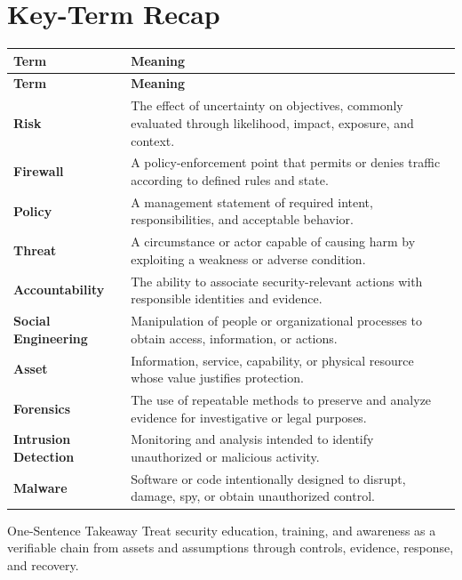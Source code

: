 \documentclass[11pt,letterpaper]{article}
\begin{document}
\section*{Key-Term Recap}
\begin{longtable}{>{\raggedright\arraybackslash}p{}>{\raggedright\arraybackslash}p{}}
\toprule\rowcolor{Navy}\color{white}\textbf{Term} & \color{white}\textbf{Meaning}\\\midrule
\endfirsthead
\toprule\rowcolor{Navy}\color{white}\textbf{Term} & \color{white}\textbf{Meaning}\\\midrule
\endhead
\textbf{Risk} & The effect of uncertainty on objectives, commonly evaluated through likelihood, impact, exposure, and context. \\\midrule
\textbf{Firewall} & A policy-enforcement point that permits or denies traffic according to defined rules and state. \\\midrule
\textbf{Policy} & A management statement of required intent, responsibilities, and acceptable behavior. \\\midrule
\textbf{Threat} & A circumstance or actor capable of causing harm by exploiting a weakness or adverse condition. \\\midrule
\textbf{Accountability} & The ability to associate security-relevant actions with responsible identities and evidence. \\\midrule
\textbf{Social Engineering} & Manipulation of people or organizational processes to obtain access, information, or actions. \\\midrule
\textbf{Asset} & Information, service, capability, or physical resource whose value justifies protection. \\\midrule
\textbf{Forensics} & The use of repeatable methods to preserve and analyze evidence for investigative or legal purposes. \\\midrule
\textbf{Intrusion Detection} & Monitoring and analysis intended to identify unauthorized or malicious activity. \\\midrule
\textbf{Malware} & Software or code intentionally designed to disrupt, damage, spy, or obtain unauthorized control. \\\midrule
\bottomrule
\end{longtable}
\begin{CornellExamBox}{One-Sentence Takeaway}
Treat security education, training, and awareness as a verifiable chain from assets and assumptions through controls, evidence, response, and recovery.
\end{CornellExamBox}
\end{document}
